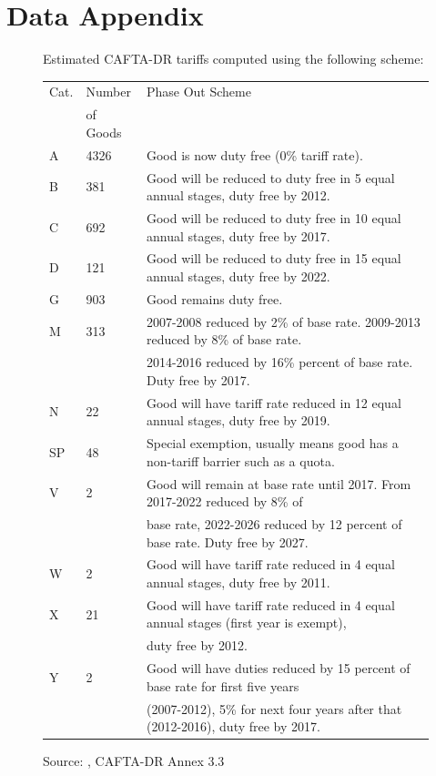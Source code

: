 \documentclass[12pt]{article}
\begin{document}
\newpage
\section{Data Appendix}
\label{sec:Appendix}

\begin{figure}[H]
\begin{center}
Estimated CAFTA-DR tariffs computed using the following scheme:
\begin{tabular}{lll}
\hline Cat. & Number & Phase Out Scheme \\
& of Goods & \\
\hline
A &4326&Good is now duty free (0\% tariff rate).\\
B & 381&Good will be reduced to duty free in 5 equal annual stages, duty free by 2012.\\
C & 692&Good will be reduced to duty free in 10 equal annual stages, duty free by 2017.\\
D & 121&Good will be reduced to duty free in 15 equal annual stages, duty free by 2022.\\
G & 903&Good remains duty free.\\
M & 313& 2007-2008 reduced by 2\% of base rate. 2009-2013 reduced by 8\% of base rate. \\
& & 2014-2016 reduced by 16\% percent of base rate. Duty free by 2017.\\
N & 22 & Good will have tariff rate reduced in 12 equal annual stages, duty free by 2019.\\
SP& 48 & Special exemption, usually means good has a non-tariff barrier such as a quota.\\
V &  2 & Good will remain at base rate until 2017. From 2017-2022 reduced by 8\% of\\
& & base rate, 2022-2026 reduced by 12 percent of base rate. Duty free by 2027.\\
W &  2 & Good will have tariff rate reduced in 4 equal annual stages, duty free by 2011.\\
X & 21 & Good will have tariff rate reduced in 4 equal annual stages (first year is exempt),\\ 
& & duty free by 2012. \\
Y & 2  & Good will have duties reduced by 15 percent of base rate for first five years\\
& & (2007-2012), 5\% for next four years after that (2012-2016), duty free by 2017.\\
\end{tabular}
\caption{\label{fig:Appendix1}}
Source: \citet{ustraderep}, CAFTA-DR Annex 3.3
\end{center}
\end{figure}
\end{document}
